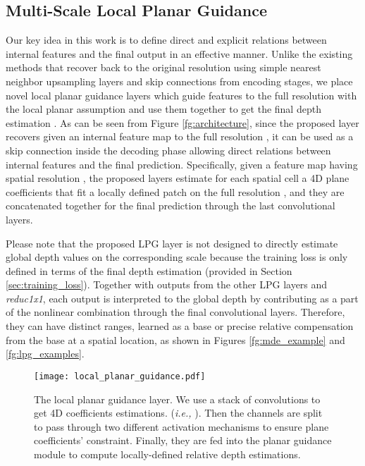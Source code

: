 \documentclass[10pt,twocolumn,letterpaper]{article}
\begin{document}
\subsection{Multi-Scale Local Planar Guidance}
Our key idea in this work is to define direct and explicit relations between internal features and the final output in an effective manner.
Unlike the existing methods that recover back to the original resolution using simple nearest neighbor upsampling layers and skip connections from encoding stages, we place novel local planar guidance layers which guide features to the full resolution with the local planar assumption and use them together to get the final depth estimation .
As can be seen from Figure \ref{fg:architecture}, since the proposed layer recovers given an internal feature map to the full resolution , it can be used as a skip connection inside the decoding phase allowing direct relations between internal features and the final prediction.
Specifically, given a feature map having spatial resolution , the proposed layers estimate for each spatial cell a 4D plane coefficients that fit a locally defined  patch on the full resolution , and they are concatenated together for the final prediction through the last convolutional layers.

Please note that the proposed LPG layer is not designed to directly estimate global depth values on the corresponding scale because the training loss is only defined in terms of the final depth estimation (provided in Section \ref{sec:training_loss}).
Together with outputs from the other LPG layers and \textit{reduc1x1}, each output is interpreted to the global depth by contributing as a part of the nonlinear combination through the final convolutional layers.
Therefore, they can have distinct ranges, learned as a base or precise relative compensation from the base at a spatial location, as shown in Figures \ref{fg:mde_example} and \ref{fg:lpg_examples}.

\begin{figure}[t]
	\centering
	\footnotesize
	\texttt{[image: local\_planar\_guidance.pdf]}
	\caption{The local planar guidance layer. We use a stack of  convolutions to get 4D coefficients estimations. (\textit{i.e.,} ). Then the channels are split to pass through two different activation mechanisms to ensure plane coefficients' constraint. Finally, they are fed into the planar guidance module to compute locally-defined relative depth estimations.}
	\label{fg:local_planar_guidance}
\end{figure}
\end{document}
